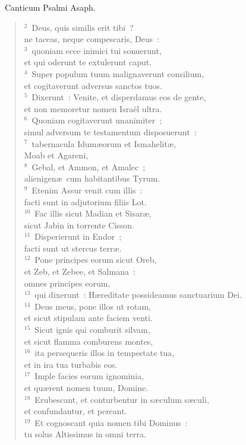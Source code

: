 ~\lettrine[lines=10,image=true,loversize=0.05,lraise=-0.03]{C}{}anticum Psalmi Asaph.
\begin{flushleft}\begin{verse}\vspace{6pt}${}^{2}$~Deus, quis similis erit tibi~?\\ ne taceas, neque compescaris, Deus~:\\
${}^{3}$~quoniam ecce inimici tui sonuerunt,\\ et qui oderunt te extulerunt caput.\\
${}^{4}$~Super populum tuum malignaverunt consilium,\\ et cogitaverunt adversus sanctos tuos.\\
${}^{5}$~Dixerunt~: Venite, et disperdamus eos de gente,\\ et non memoretur nomen Isra\"el ultra.\\
${}^{6}$~Quoniam cogitaverunt unanimiter~;\\ simul adversum te testamentum disposuerunt~:\\
${}^{7}$~tabernacula Idum\ae orum et Ismahelit\ae ,\\ Moab et Agareni,\\
${}^{8}$~Gebal, et Ammon, et Amalec~;\\ alienigen\ae\ cum habitantibus Tyrum.\\
${}^{9}$~Etenim Assur venit cum illis~:\\ facti sunt in adjutorium filiis Lot.\\
${}^{10}$~Fac illis sicut Madian et Sisar\ae ,\\ sicut Jabin in torrente Cisson.\\
${}^{11}$~Disperierunt in Endor~;\\ facti sunt ut stercus terr\ae .\\
${}^{12}$~Pone principes eorum sicut Oreb,\\ et Zeb, et Zebee, et Salmana~:\\ omnes principes eorum,\\
${}^{13}$~qui dixerunt~: H\ae reditate possideamus sanctuarium Dei.\\
${}^{14}$~Deus meus, pone illos ut rotam,\\ et sicut stipulam ante faciem venti.\\
${}^{15}$~Sicut ignis qui comburit silvam,\\ et sicut flamma comburens montes,\\
${}^{16}$~ita persequeris illos in tempestate tua,\\ et in ira tua turbabis eos.\\
${}^{17}$~Imple facies eorum ignominia,\\ et qu\ae rent nomen tuum, Domine.\\
${}^{18}$~Erubescant, et conturbentur in s\ae culum s\ae culi,\\ et confundantur, et pereant.\\
${}^{19}$~Et cognoscant quia nomen tibi Dominus~:\\ tu solus Altissimus in omni terra.\end{verse}\end{flushleft}


